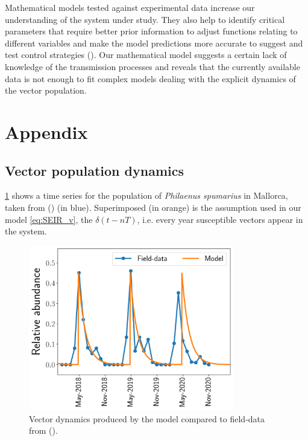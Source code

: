 Mathematical models tested against experimental data increase our
understanding of the system under study. They also help to identify critical
parameters that require better prior information to adjust functions relating
to different variables and make the model predictions more accurate to suggest
and test control strategies (\cite{cunniffe2015thirteen, jeger2018plant}). Our
mathematical model suggests a certain lack of knowledge of the transmission
processes and reveals that the currently available data is not enough to fit
complex models dealing with the explicit dynamics of the vector population. \\

\section{Appendix}

\subsection{Vector population dynamics}\label{app:vector_dynamics}

\cref{fig:vector_dynamics} shows a time series for the population of
\textit{Philaenus spumarius} in Mallorca, taken from (\cite{Lopez2021}) (in
blue). Superimposed (in orange) is the assumption used in our model
\cref{eq:SEIR_v}, the $\delta(t-nT)$, i.e. every year susceptible vectors
appear in the system.

\begin{figure}[H]
    \centering
    \includegraphics[width=0.8\textwidth]{Figures/Vector_dynamics.pdf}
    \caption{Vector dynamics produced by the model compared to field-data
        from (\cite{Lopez2021}).}
    \label{fig:vector_dynamics}
\end{figure}

